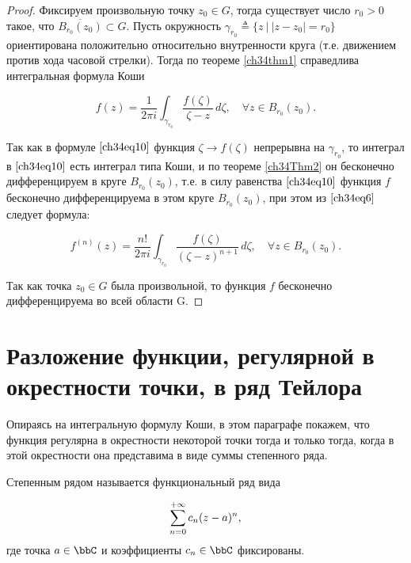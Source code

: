 \begin{proof}
Фиксируем произвольную точку $z_0 \in G$, тогда существует число $r_0 > 0$ такое, что $\overline{B_{r_0}(z_0)}\subset G$. Пусть окружность $\gamma_{r_0} \triangleq \{ z \: \bigl| \: |z - z_0| = r_0 \}$ ориентирована положительно относительно внутренности круга (т.е. движением против хода часовой стрелки). Тогда по теореме \ref{ch34thm1} справедлива интегральная формула Коши

\begin{equation} \label{ch34eq10}
f(z) = \frac{1}{2\pi i} \int_{\gamma_{r_0}} \frac{f(\zeta)}{\zeta - z} \,d\zeta, \quad \forall z \in B_{r_0}(z_0).
\end{equation}

Так как в формуле $\eqref{ch34eq10}$ функция $\zeta \to f(\zeta)$ непрерывна на $\gamma_{r_0}$, то интеграл в $\eqref{ch34eq10}$ есть интеграл типа Коши, и по теореме \ref{ch34Thm2} он бесконечно дифференцируем в круге $B_{r_0}(z_0)$, т.е. в силу равенства $\eqref{ch34eq10}$ функция $f$ бесконечно дифференцируема в этом круге $B_{r_0}(z_0)$, при этом из $\eqref{ch34eq6}$ следует формула:

\begin{equation} \label{ch34eq11}
f^{(n)}(z) = \frac{n!}{2\pi i} \int_{\gamma_{r_0}} \frac{f(\zeta)}{(\zeta - z)^{n+1}}\,d\zeta, \quad \forall z \in B_{r_0}(z_0).
\end{equation}


Так как точка $z_0 \in G$ была произвольной, то функция $f$ бесконечно дифференцируема во всей области G.
\end{proof}


\section{Разложение функции, регулярной в окрестности точки, в ряд Тейлора}

Опираясь на интегральную формулу Коши, в этом параграфе покажем, что функция регулярна в окрестности некоторой точки тогда и только тогда, когда в этой окрестности она представима в виде суммы степенного ряда.

\begin{defn}
$\textit{Степенным рядом}$ называется функциональный ряд вида

\begin{equation} \label{ch34.2eq1}
\sum_{n = 0}^{+\infty}\limits c_n (z - a)^n,
\end{equation}
где точка $a \in \bbC$ и коэффициенты $c_n \in \bbC$ фиксированы.
\end{defn}

